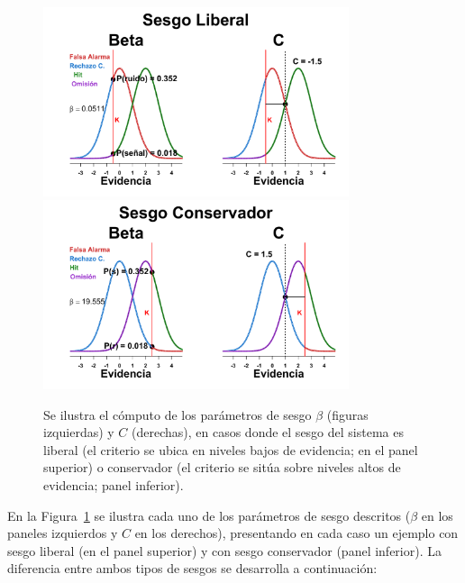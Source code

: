 \begin{itemize}
\begin{figure}[h]
\centering
\includegraphics[width=0.8\textwidth]{Figures/Graficador_Sesgo_LiberalR}\\
\includegraphics[width=0.8\textwidth]{Figures/Graficador_Sesgo_ConservadorR}\\
\caption[Estimación paramétrica: Sesgos $\beta$ y $c$]{Se ilustra el cómputo de los parámetros de sesgo $\beta$ (figuras izquierdas) y $C$ (derechas), en casos donde el sesgo del sistema es liberal (el criterio se ubica en niveles bajos de evidencia; en el panel superior) o conservador (el criterio se sitúa sobre niveles altos de evidencia; panel inferior).}
\label{fig:Graf_Sesgo}
\end{figure}
\end{itemize} 

En la Figura~\ref{fig:Graf_Sesgo} se ilustra cada uno de los parámetros de sesgo descritos ($\beta$ en los paneles izquierdos y $C$ en los derechos), presentando en cada caso un ejemplo con sesgo liberal (en el panel superior) y con sesgo conservador (panel inferior). La diferencia entre ambos tipos de sesgos se desarrolla a continuación:\\

